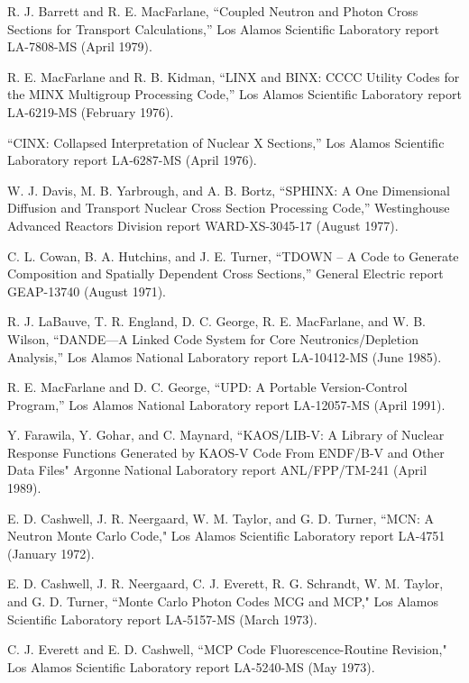 \documentclass[11pt,twoside]{NJOYMan}
\begin{document}
\begin{thebibliography}{99}
\begin{singlespace}
 R. J. Barrett and R. E. MacFarlane, ``Coupled
  Neutron and Photon Cross Sections for Transport Calculations,''
  Los Alamos Scientific Laboratory report LA-7808-MS (April 1979).

 R. E. MacFarlane and R. B. Kidman,
  ``LINX and BINX: CCCC Utility Codes for the MINX Multigroup
  Processing Code,'' Los Alamos Scientific Laboratory report
  LA-6219-MS (February 1976).

 ``CINX: Collapsed Interpretation of Nuclear
  X Sections,'' Los Alamos Scientific Laboratory
  report LA-6287-MS (April 1976).

 W. J. Davis, M. B. Yarbrough, and A. B. Bortz,
  ``SPHINX: A One Dimensional Diffusion and Transport Nuclear
  Cross Section Processing Code,'' Westinghouse Advanced Reactors
  Division report WARD-XS-3045-17 (August 1977).

 C. L. Cowan, B. A. Hutchins, and J. E. Turner,
  ``TDOWN -- A Code to Generate Composition and Spatially
  Dependent Cross Sections,'' General Electric report GEAP-13740
  (August 1971).

 R. J. LaBauve, T. R. England, D. C. George,
  R. E. MacFarlane, and W. B. Wilson, ``DANDE---A Linked Code
  System for Core Neutronics/Depletion Analysis,'' Los Alamos
  National Laboratory report LA-10412-MS (June 1985).

 R. E. MacFarlane and D. C. George, ``UPD: A
  Portable Version-Control Program,'' Los Alamos National Laboratory
  report LA-12057-MS (April 1991).

 Y. Farawila, Y. Gohar, and C. Maynard, ``KAOS/LIB-V:
  A Library of Nuclear Response Functions Generated by KAOS-V Code
  From ENDF/B-V and Other Data Files" Argonne National Laboratory
  report ANL/FPP/TM-241 (April 1989).

 E. D. Cashwell, J. R. Neergaard, W. M. Taylor, and
  G. D. Turner, ``MCN: A Neutron Monte Carlo Code," Los Alamos Scientific
  Laboratory report LA-4751 (January 1972).

 E. D. Cashwell, J. R. Neergaard, C. J. Everett,
  R. G. Schrandt, W. M. Taylor, and G. D. Turner, ``Monte Carlo Photon
  Codes MCG and MCP," Los Alamos Scientific Laboratory report
  LA-5157-MS (March 1973).

 C. J. Everett and E. D. Cashwell, ``MCP Code
  Fluorescence-Routine Revision," Los Alamos Scientific Laboratory
  report LA-5240-MS (May 1973).


\end{singlespace}
\end{thebibliography}
\end{document}
